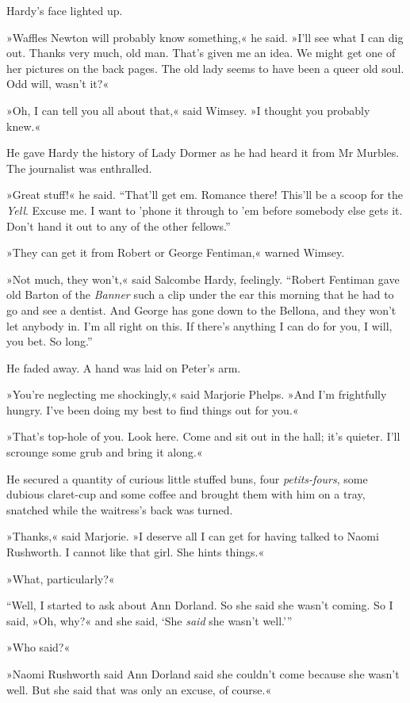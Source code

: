 Hardy's face lighted up.

»Waffles Newton will probably know something,« he said. »I'll see what I can dig out. Thanks very much, old man. That's given me an idea. We might get one of her pictures on the back pages. The old lady seems to have been a queer old soul. Odd will, wasn't it?«

»Oh, I can tell you all about that,« said Wimsey. »I thought you probably knew.«

He gave Hardy the history of Lady Dormer as he had heard it from Mr Murbles. The journalist was enthralled.

»Great stuff!« he said. \enquote{That'll get em. Romance there! This'll be a scoop for the \textit{Yell}. Excuse me. I want to 'phone it through to 'em before somebody else gets it. Don't hand it out to any of the other fellows.}

»They can get it from Robert or George Fentiman,« warned Wimsey.

»Not much, they won't,« said Salcombe Hardy, feelingly. \enquote{Robert Fentiman gave old Barton of the \textit{Banner} such a clip under the ear this morning that he had to go and see a dentist. And George has gone down to the Bellona, and they won't let anybody in. I'm all right on this. If there's anything I can do for you, I will, you bet. So long.}

He faded away. A hand was laid on Peter's arm.

»You're neglecting me shockingly,« said Marjorie Phelps. »And I'm frightfully hungry. I've been doing my best to find things out for you.«

»That's top-hole of you. Look here. Come and sit out in the hall; it's quieter. I'll scrounge some grub and bring it along.«

He secured a quantity of curious little stuffed buns, four \textit{petits-fours}, some dubious claret-cup and some coffee and brought them with him on a tray, snatched while the waitress's back was turned.

»Thanks,« said Marjorie. »I deserve all I can get for having talked to Naomi Rushworth. I cannot like that girl. She hints things.«

»What, particularly?«

\enquote{Well, I started to ask about Ann Dorland. So she said she wasn't coming. So I said, »Oh, why?« and she said, \enquote{She \textit{said} she wasn't well.}}

»Who said?«

»Naomi Rushworth said Ann Dorland said she couldn't come because she wasn't well. But she said that was only an excuse, of course.«

